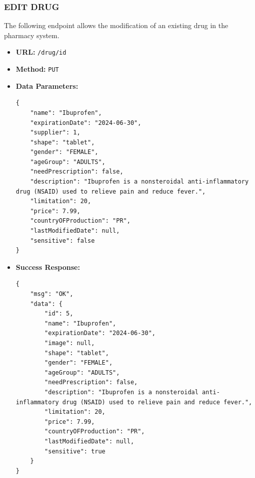 \subsubsection*{EDIT DRUG}
The following endpoint allows the modification of an existing drug in the pharmacy system.
\begin{itemize}
    \item \textbf{URL:}
    \newline \hspace*{1cm} \texttt{/drug/{id}}  
    \item \textbf{Method:}
    \newline \hspace*{1cm}\texttt{PUT}
    \item \textbf{Data Parameters:}
\begin{lstlisting}[breaklines]
{
    "name": "Ibuprofen",
    "expirationDate": "2024-06-30",
    "supplier": 1,
    "shape": "tablet",
    "gender": "FEMALE",
    "ageGroup": "ADULTS",
    "needPrescription": false,
    "description": "Ibuprofen is a nonsteroidal anti-inflammatory drug (NSAID) used to relieve pain and reduce fever.",
    "limitation": 20,
    "price": 7.99,
    "countryOFProduction": "PR",
    "lastModifiedDate": null,
    "sensitive": false
}

\end{lstlisting}
    \item \textbf{Success Response:}
\begin{lstlisting}[breaklines]
{
    "msg": "OK",
    "data": {
        "id": 5,
        "name": "Ibuprofen",
        "expirationDate": "2024-06-30",
        "image": null,
        "shape": "tablet",
        "gender": "FEMALE",
        "ageGroup": "ADULTS",
        "needPrescription": false,
        "description": "Ibuprofen is a nonsteroidal anti-inflammatory drug (NSAID) used to relieve pain and reduce fever.",
        "limitation": 20,
        "price": 7.99,
        "countryOFProduction": "PR",
        "lastModifiedDate": null,
        "sensitive": true
    }
}

\end{lstlisting}
\end{itemize}

